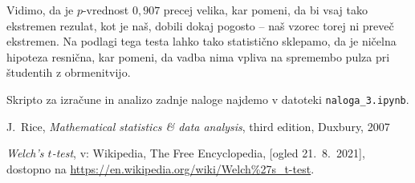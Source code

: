 \documentclass[a4paper,11pt]{article}
\begin{document}
Vidimo, da je $p$-vrednost $0,907$ precej velika, kar pomeni, da bi vsaj tako ekstremen rezulat, kot je naš, dobili dokaj pogosto -- naš vzorec torej ni preveč ekstremen. Na podlagi tega testa lahko tako statistično sklepamo, da je ničelna hipoteza resnična, kar pomeni, da vadba nima vpliva na spremembo pulza pri študentih z obrmenitvijo.

Skripto za izračune in analizo zadnje naloge najdemo v datoteki \linebreak \texttt{naloga\_3.ipynb}.

\begin{thebibliography}{99}

    J.~Rice, \emph{Mathematical statistics \& data analysis}, third edition, Duxbury, 2007

    \emph{Welch's $t$-test}, v: Wikipedia, The Free Encyclopedia, [ogled 21.~8.~2021], dostopno na \url{https://en.wikipedia.org/wiki/Welch%27s_t-test}.
    
\end{thebibliography}
\end{document}
